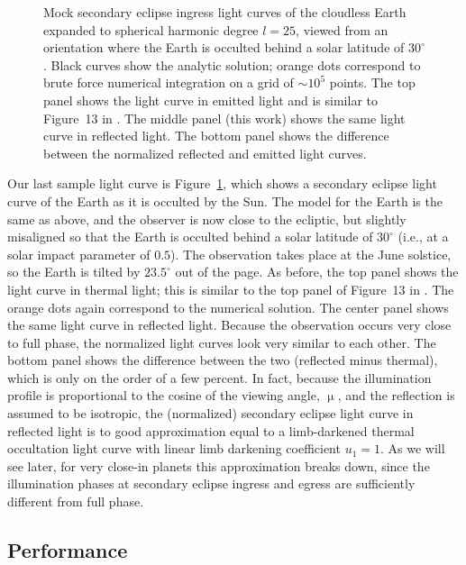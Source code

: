 \documentclass[modern]{aastex62}
\begin{document}
\begin{figure}[p!]
\begin{centering}
{            Mock secondary eclipse ingress light curves of the
            cloudless Earth expanded to spherical harmonic degree $l = 25$,
            viewed from an orientation where the Earth is occulted behind
            a solar latitude of $30^\circ$.
            Black curves show the analytic solution; orange dots correspond
            to brute force numerical integration on a grid of
            ${\sim}10^5$ points.
            The top panel shows the light curve in emitted light and is
            similar to Figure~13 in \citet{Luger2019}.
            The middle panel (this work) shows the same light curve in
            reflected light.
            The bottom panel shows the difference between the
            normalized reflected and emitted light curves.
            \label{fig:earthsun}
        }
    \end{centering}
\end{figure}

Our last sample light curve is Figure~\ref{fig:earthsun}, which shows
a secondary eclipse light curve of the Earth as it is occulted by the
Sun. The model for the Earth is the same as above, and the observer is
now close to the ecliptic, but slightly misaligned so that the
Earth is occulted behind a solar latitude of $30^\circ$ (i.e., at
a solar impact parameter of $0.5$). The observation takes place at the
June solstice, so the Earth is tilted by $23.5^\circ$ out of the page.
As before, the top panel shows the light curve in thermal light; this
is similar to the top panel of Figure~13 in \citet{Luger2019}. The orange
dots again correspond to the numerical solution.
%
The center panel shows the same light curve in reflected light.
Because the observation occurs very close to full phase, the normalized
light curves look very similar to each other.
The bottom panel shows the difference between the two
(reflected minus thermal), which is only on the order of a few percent.
%
In fact, because
the illumination profile is proportional to the cosine of the viewing
angle, $\upmu$, and the reflection is assumed to be isotropic, the
(normalized) secondary eclipse light curve in reflected light is to
good approximation equal
to a limb-darkened thermal occultation light curve with
linear limb darkening coefficient $u_1 = 1$. As we will see later, for very
close-in planets this approximation breaks down, since the illumination
phases at secondary eclipse ingress and egress are sufficiently different
from full phase.

%

\subsection{Performance}
\label{sec:performance}
\end{document}
